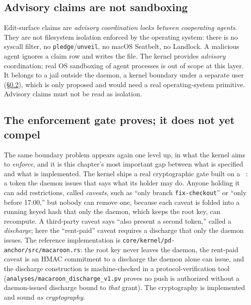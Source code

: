 \documentclass[11pt,a4paper]{article}
\theoremstyle{definition}
\theoremstyle{remark}
\begin{document}
\subsection{Advisory claims are not sandboxing}

Edit-surface claims are \emph{advisory coordination locks between cooperating
agents}. They are not filesystem isolation enforced by the operating system: there
is no syscall filter, no \texttt{pledge}/\texttt{unveil}, no macOS
Seatbelt, no Landlock. A malicious agent ignores a claim row and writes the file.
The kernel provides \emph{advisory} coordination; real OS sandboxing of agent
processes is out of scope at this layer. It belongs to a jail outside the daemon, a
kernel boundary under a separate user (\S\ref{sec:enforcement-gap}), which is only
proposed and would need a real operating-system primitive. Advisory claims must
not be read as isolation.

\subsection{The enforcement gate proves; it does not yet compel}
\label{sec:enforcement-gap}

The same boundary problem appears again one level up, in what the kernel aims
to \emph{enforce}, and it is this chapter's most important gap between what is
specified and what is implemented. The kernel ships a real cryptographic gate
built on a ~: a token the daemon
issues that says what its holder may do. Anyone holding it can add restrictions,
called \emph{caveats}, such as ``only branch \texttt{fix-checkout}'' or ``only
before 17:00,'' but nobody can remove one, because each caveat is folded into a
running keyed hash that only the daemon, which keeps the root key, can
recompute. A third-party caveat says ``also present a second token,'' called a
\emph{discharge}; here the ``rent-paid'' caveat requires a discharge that only
the daemon issues. The reference implementation is
\texttt{core/kernel/pd-anchor/src/macaroon.rs}: the root key never leaves the
daemon, the rent-paid caveat is an HMAC commitment to a discharge the daemon
alone can issue, and the discharge construction is machine-checked in a
protocol-verification tool (\texttt{analyses/macaroon\_discharge\_v1.pv} proves
no push is authorized without a daemon-issued discharge bound to \emph{that}
grant). The cryptography is implemented and sound \emph{as cryptography}.

\end{document}
